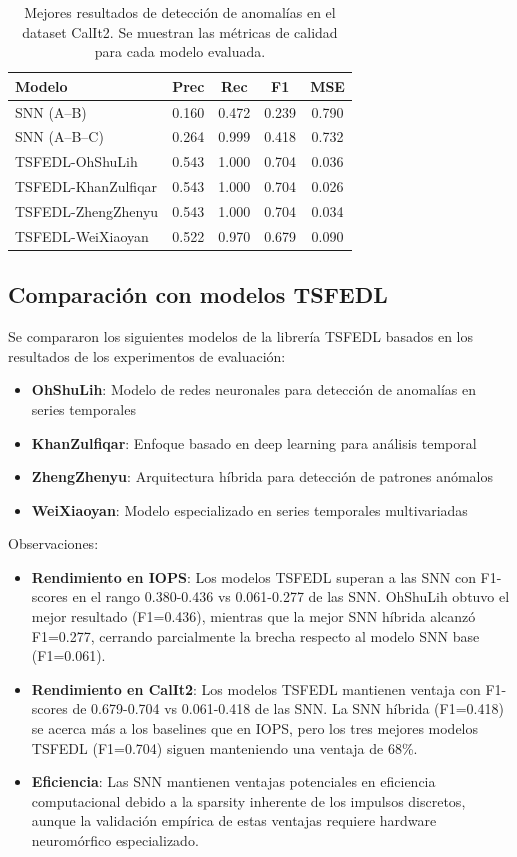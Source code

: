 \begin{table}[htbp]
\centering
\small
\begin{tabular}{lcccc}
\hline\hline
\textbf{Modelo} & \textbf{Prec} & \textbf{Rec} & \textbf{F1} & \textbf{MSE} \\
\hline
SNN (A--B) & 0.160 & 0.472 & 0.239 & 0.790 \\
SNN (A--B--C) & 0.264 & 0.999 & 0.418 & 0.732 \\
TSFEDL-OhShuLih & 0.543 & 1.000 & 0.704 & 0.036 \\
TSFEDL-KhanZulfiqar & 0.543 & 1.000 & 0.704 & 0.026 \\
TSFEDL-ZhengZhenyu & 0.543 & 1.000 & 0.704 & 0.034 \\
TSFEDL-WeiXiaoyan & 0.522 & 0.970 & 0.679 & 0.090 \\
\hline\hline
\end{tabular}
\caption{Mejores resultados de detección de anomalías en el dataset CalIt2. Se muestran las métricas de calidad para cada modelo evaluada.}
\label{tab:resultados-iops}
\end{table}

\subsection{Comparación con modelos TSFEDL}
Se compararon los siguientes modelos de la librería TSFEDL basados en los resultados de los experimentos de evaluación:
\begin{itemize}
    \item \textbf{OhShuLih}: Modelo de redes neuronales para detección de anomalías en series temporales
    \item \textbf{KhanZulfiqar}: Enfoque basado en deep learning para análisis temporal
    \item \textbf{ZhengZhenyu}: Arquitectura híbrida para detección de patrones anómalos
    \item \textbf{WeiXiaoyan}: Modelo especializado en series temporales multivariadas
\end{itemize}
Observaciones:
\begin{itemize}
    \item \textbf{Rendimiento en IOPS}: Los modelos TSFEDL superan a las SNN con F1-scores en el rango 0.380-0.436 vs 0.061-0.277 de las SNN. OhShuLih obtuvo el mejor resultado (F1=0.436), mientras que la mejor SNN híbrida alcanzó F1=0.277, cerrando parcialmente la brecha respecto al modelo SNN base (F1=0.061).
    \item \textbf{Rendimiento en CalIt2}: Los modelos TSFEDL mantienen ventaja con F1-scores de 0.679-0.704 vs 0.061-0.418 de las SNN. La SNN híbrida (F1=0.418) se acerca más a los baselines que en IOPS, pero los tres mejores modelos TSFEDL (F1=0.704) siguen manteniendo una ventaja de 68\%.
    \item \textbf{Eficiencia}: Las SNN mantienen ventajas potenciales en eficiencia computacional debido a la sparsity inherente de los impulsos discretos, aunque la validación empírica de estas ventajas requiere hardware neuromórfico especializado.
\end{itemize}
